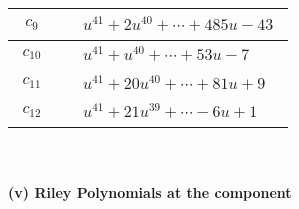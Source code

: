\documentclass[1p]{elsarticle_modified}
\theoremstyle{definition}
\begin{document}
\begin{tabular}{m{50pt}|m{274pt}}
\hline $$\begin{aligned}c_{9}\end{aligned}$$&$\begin{aligned}
&u^{41}+2 u^{40}+\cdots+485 u-43
\end{aligned}$\\
\hline $$\begin{aligned}c_{10}\end{aligned}$$&$\begin{aligned}
&u^{41}+u^{40}+\cdots+53 u-7
\end{aligned}$\\
\hline $$\begin{aligned}c_{11}\end{aligned}$$&$\begin{aligned}
&u^{41}+20 u^{40}+\cdots+81 u+9
\end{aligned}$\\
\hline $$\begin{aligned}c_{12}\end{aligned}$$&$\begin{aligned}
&u^{41}+21 u^{39}+\cdots-6 u+1
\end{aligned}$\\
\hline
\end{tabular}\\~\\
\newpage\renewcommand{\arraystretch}{1}
\flushleft \textbf{(v) Riley Polynomials at the component}\newline \\
\end{document}

